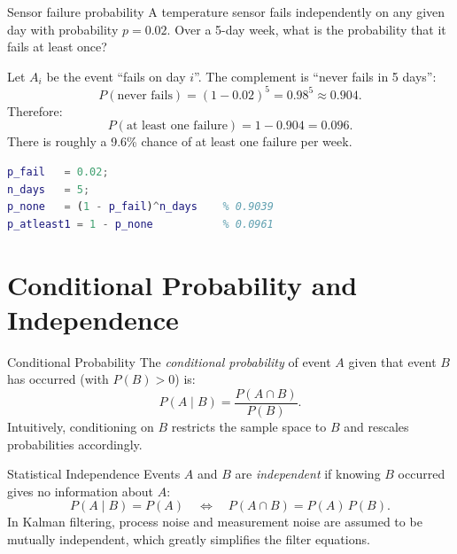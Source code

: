\begin{examplebox}{Sensor failure probability}
A temperature sensor fails independently on any given day with
probability $p = 0.02$.  Over a 5-day week, what is the probability
that it fails at least once?

\solution
Let $A_i$ be the event ``fails on day $i$''.  The complement is ``never
fails in 5 days'':
\[
  P(\text{never fails}) = (1-0.02)^5 = 0.98^5 \approx 0.904.
\]
Therefore:
\[
  P(\text{at least one failure}) = 1 - 0.904 = 0.096.
\]
There is roughly a 9.6\% chance of at least one failure per week.

\begin{lstlisting}[language=Matlab]
p_fail   = 0.02;
n_days   = 5;
p_none   = (1 - p_fail)^n_days    % 0.9039
p_atleast1 = 1 - p_none           % 0.0961
\end{lstlisting}
\end{examplebox}

\section{Conditional Probability and Independence}
\label{sec:app_conditional}

\begin{defnbox}{Conditional Probability}
The \emph{conditional probability} of event $A$ given that event $B$
has occurred (with $P(B) > 0$) is:
\[
  P(A \mid B) = \frac{P(A \cap B)}{P(B)}.
\]
Intuitively, conditioning on $B$ restricts the sample space to $B$ and
rescales probabilities accordingly.
\end{defnbox}

\begin{defnbox}{Statistical Independence}
Events $A$ and $B$ are \emph{independent} if knowing $B$ occurred
gives no information about $A$:
\[
  P(A \mid B) = P(A) \quad \Longleftrightarrow \quad
  P(A \cap B) = P(A)\,P(B).
\]
In Kalman filtering, process noise and measurement noise are assumed
to be mutually independent, which greatly simplifies the filter
equations.
\end{defnbox}

